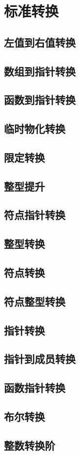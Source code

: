 \chapter{标准转换}

\section{左值到右值转换}
\section{数组到指针转换}
\section{函数到指针转换}
\section{临时物化转换}
\section{限定转换}
\section{整型提升}
\section{符点指针转换}
\section{整型转换}
\section{符点转换}
\section{符点整型转换}
\section{指针转换}
\section{指针到成员转换}
\section{函数指针转换}
\section{布尔转换}
\section{整数转换阶}
